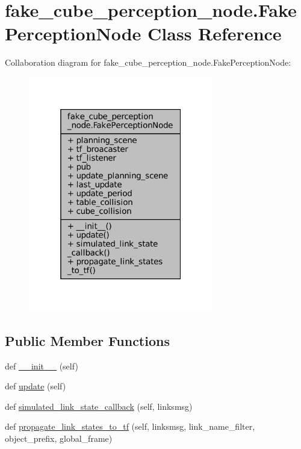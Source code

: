 \hypertarget{classfake__cube__perception__node_1_1FakePerceptionNode}{}\section{fake\+\_\+cube\+\_\+perception\+\_\+node.\+Fake\+Perception\+Node Class Reference}
\label{classfake__cube__perception__node_1_1FakePerceptionNode}


Collaboration diagram for fake\+\_\+cube\+\_\+perception\+\_\+node.\+Fake\+Perception\+Node\+:
\nopagebreak
\begin{figure}[H]
\begin{center}
\leavevmode
\includegraphics[width=229pt]{classfake__cube__perception__node_1_1FakePerceptionNode__coll__graph}
\end{center}
\end{figure}
\subsection*{Public Member Functions}
\begin{DoxyCompactItemize}
\item 
def \hyperlink{classfake__cube__perception__node_1_1FakePerceptionNode_a6f5d90816c2222cf76bd632b5ad46457}{\+\_\+\+\_\+init\+\_\+\+\_\+} (self)
\item 
def \hyperlink{classfake__cube__perception__node_1_1FakePerceptionNode_ae73741e7f84f057cbf109698e70a2515}{update} (self)
\item 
def \hyperlink{classfake__cube__perception__node_1_1FakePerceptionNode_ac1127eae8d2eda994b22873529bd198f}{simulated\+\_\+link\+\_\+state\+\_\+callback} (self, linksmsg)
\item 
def \hyperlink{classfake__cube__perception__node_1_1FakePerceptionNode_aeac788f768e625ecbe445c6af105d3f8}{propagate\+\_\+link\+\_\+states\+\_\+to\+\_\+tf} (self, linksmsg, link\+\_\+name\+\_\+filter, object\+\_\+prefix, global\+\_\+frame)
\end{DoxyCompactItemize}
